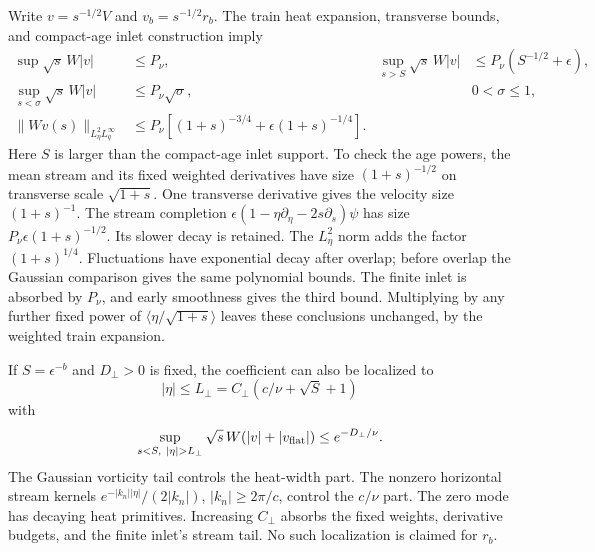 Write $v=s^{-1/2}V$ and $v_b=s^{-1/2}r_b$. The train heat expansion,
transverse bounds, and compact-age inlet construction imply
\begin{equation}\label{stress-short:coefficients}
 \begin{aligned}
 \sup\sqrt{s}\,W|v|&\le P_\nu,&
 \sup_{s>S}\sqrt{s}\,W|v|&\le P_\nu(S^{-1/2}+\epsilon),\\
 \sup_{s<\sigma}\sqrt{s}\,W|v|&\le P_\nu\sqrt{\sigma},
       &&0<\sigma\le1,\\
 \|Wv(s)\|_{L^2_\eta L^\infty_q}
       &\le P_\nu[(1+s)^{-3/4}
                         +\epsilon(1+s)^{-1/4}].
 \end{aligned}
\end{equation}
Here $S$ is larger than the compact-age inlet support. To check the
age powers, the mean stream and its fixed weighted derivatives have
size $(1+s)^{-1/2}$ on transverse scale $\sqrt{1+s}$.
One transverse derivative gives the velocity size $(1+s)^{-1}$.
The stream completion
$\epsilon(1-\eta\partial_\eta-2s\partial_s)\psi$ has size
$P_\nu\epsilon(1+s)^{-1/2}$. Its slower decay is retained.
The $L^2_\eta$ norm adds the factor $(1+s)^{1/4}$.
Fluctuations have exponential decay after overlap; before overlap
the Gaussian comparison gives the same polynomial bounds.
The finite inlet is absorbed by $P_\nu$, and early smoothness gives
the third bound. Multiplying by any further fixed power of
$\langle\eta/\sqrt{1+s}\rangle$ leaves these conclusions unchanged,
by the weighted train expansion.

If $S=\epsilon^{-b}$ and $D_\perp>0$ is fixed, the coefficient can
also be localized to
\[
 |\eta|\le L_\perp=C_\perp(c/\nu+\sqrt S+1)
\]
with
\begin{equation}\label{stress-short:transverse}
 \sup_{s<S,\ |\eta|>L_\perp}
 \sqrt{s}\,W(|v|+|v_{\rm flat}|)
       \le e^{-D_\perp/\nu}.
\end{equation}
The Gaussian vorticity tail controls the heat-width part.
The nonzero horizontal stream kernels
$e^{-|k_n||\eta|}/(2|k_n|)$, $|k_n|\ge2\pi/c$, control the
$c/\nu$ part. The zero mode has decaying heat primitives.
Increasing $C_\perp$ absorbs the fixed weights, derivative budgets,
and the finite inlet's stream tail. No such localization is claimed
for $r_b$.

